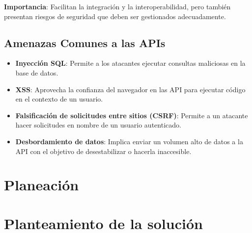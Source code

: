 \documentclass{article}
\begin{document}
    \textbf{Importancia}: Facilitan la integración y la interoperabilidad, pero también presentan riesgos de seguridad que deben ser gestionados adecuadamente.

    \subsection{Amenazas Comunes a las APIs}
    \begin{itemize}
        \item \textbf{Inyección SQL}: Permite a los atacantes ejecutar consultas maliciosas en la base de datos.
        \item \textbf{XSS}: Aprovecha la confianza del navegador en las API para ejecutar código en el contexto de un usuario.
        \item \textbf{Falsificación de solicitudes entre sitios (CSRF)}: Permite a un atacante hacer solicitudes en nombre de un usuario autenticado.
        \item \textbf{Desbordamiento de datos}: Implica enviar un volumen alto de datos a la API con el objetivo de desestabilizar o hacerla inaccesible.
    \end{itemize}

    \section{Planeación}
    \section{Planteamiento de la solución}
\end{document}
